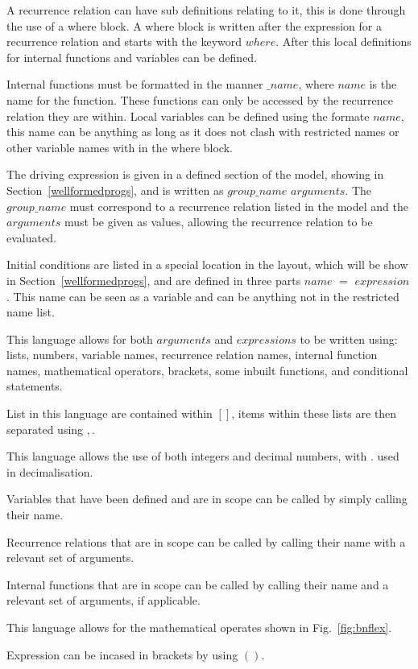 \documentclass{article}
\begin{document}
A recurrence relation can have sub definitions relating to it, this is done through the use of a where block. A where block is written after the expression for a recurrence relation and starts with the keyword $where$. After this local definitions for internal functions and variables can be defined. 

Internal functions must be formatted in the manner $\_name$, where $name$ is the name for the function. These functions can only be accessed by the recurrence relation they are within. Local variables can be defined using the formate $name$, this name can be anything as long as it does not clash with restricted names or other variable names with in the where block. 

The driving expression is given in a defined section of the model, showing in Section~\ref{wellformedprogs}, and is written as  $group\_name$ $arguments$. The  $group\_name$ must correspond to a recurrence relation listed in the model and the $arguments$ must be given as values, allowing the recurrence relation to be evaluated. 

Initial conditions are listed in a special location in the layout, which will be show in Section~\ref{wellformedprogs}, and are defined in three parts $name$ $=$ $expression$. This name can be seen as a variable and can be anything not in the restricted name list. 

This language allows for both $arguments$ and $expressions$ to be written using: lists, numbers, variable names, recurrence relation names, internal function names, mathematical operators, brackets, some inbuilt functions, and conditional statements. 

List in this language are contained within $[]$, items within these lists are then separated using $,$.  

This language allows the use of both integers and decimal numbers, with $.$ used in decimalisation. 

Variables that have been defined and are in scope can be called by simply calling their name. 

Recurrence relations that are in scope can be called by calling their name with a relevant set of arguments.  

Internal functions that are in scope can be called by calling their name and a relevant set of arguments, if applicable. 

This language allows for the mathematical operates shown in Fig.~\ref{fig:bnflex}.

Expression can be incased in brackets by using $()$.
\end{document}
